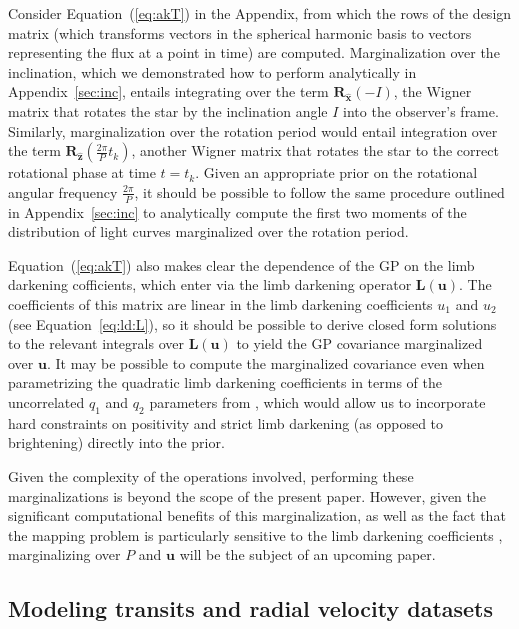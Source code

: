 \documentclass[modern,linenumbers]{aastex62}
\begin{document}
Consider Equation~(\ref{eq:akT}) in the Appendix, from which the rows of the
design matrix (which transforms vectors in the spherical harmonic basis to vectors
representing the flux at a point in time) are computed. Marginalization over the
inclination, which we demonstrated how to perform analytically in
Appendix~\ref{sec:inc}, entails integrating over the term
$\mathbf{R}_{\hat{\mathbf{x}}}\left(-I\right)$, the Wigner matrix that rotates
the star by the inclination angle $I$ into the observer's frame.
Similarly, marginalization over the
rotation period would entail integration over the term
$\mathbf{R}_{\hat{\mathbf{z}}}\left(\frac{2\pi}{P} t_k\right)$, another
Wigner matrix that rotates the star to the correct rotational phase at
time $t = t_k$. Given an appropriate prior on the rotational angular
frequency $\frac{2\pi}{P}$, it should be possible to follow the same
procedure outlined in Appendix~\ref{sec:inc} to analytically
compute the first two moments of the distribution of light curves marginalized over the
rotation period.

Equation~(\ref{eq:akT}) also makes clear the dependence of the GP on
the limb darkening cofficients, which enter via the limb darkening
operator $\mathbf{L}(\mathbf{u})$. The coefficients
of this matrix are linear in the limb darkening coefficients $u_1$ and $u_2$
(see Equation~\ref{eq:ld:L}), so it should be possible to derive closed
form solutions to the relevant integrals over $\mathbf{L}(\mathbf{u})$ to
yield the GP covariance marginalized over $\mathbf{u}$. It may be
possible to compute the marginalized covariance even when parametrizing
the quadratic limb darkening
coefficients in terms of the uncorrelated $q_1$ and $q_2$ parameters from
\citet{Kipping2013}, which would allow us to incorporate hard constraints on positivity
and strict limb darkening (as opposed to brightening) directly into the prior.

Given the complexity of the operations involved,
performing these marginalizations is beyond the scope of the present paper.
However, given the significant computational benefits of this marginalization,
as well as the fact that the mapping problem is particularly sensitive to
the limb darkening coefficients , marginalizing over
$P$ and $\mathbf{u}$ will be the subject of an upcoming paper.

\subsection{Modeling transits and radial velocity datasets}
\label{sec:transits-rvs}
\end{document}
